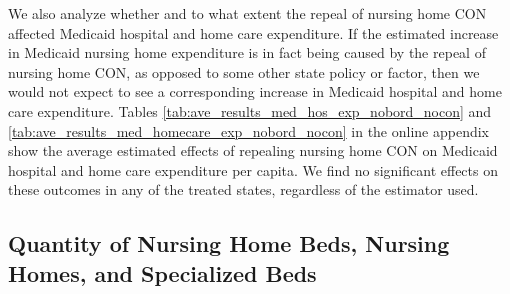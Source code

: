 \documentclass[../Main.tex]{subfiles}
\begin{document}
\indent We also analyze whether and to what extent the repeal of nursing home CON affected Medicaid hospital and home care expenditure. If the estimated increase in Medicaid nursing home expenditure is in fact being caused by the repeal of nursing home CON, as opposed to some other state policy or factor, then we would not expect to see a corresponding increase in Medicaid hospital and home care expenditure. Tables \ref{tab:ave_results_med_hos_exp_nobord_nocon} and \ref{tab:ave_results_med_homecare_exp_nobord_nocon} in the online appendix show the average estimated effects of repealing nursing home CON on Medicaid hospital and home care expenditure per capita. We find no significant effects on these outcomes in any of the treated states, regardless of the estimator used.


\subsection{Quantity of Nursing Home Beds, Nursing Homes, and Specialized Beds}
\end{document}
